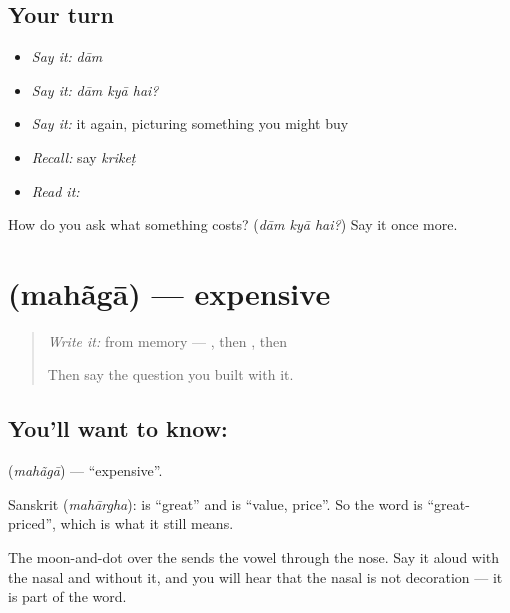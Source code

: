 \subsection*{Your turn}
\begin{itemize}
\raggedright
  \item \emph{Say it:} \emph{dām}
  \item \emph{Say it:} \emph{dām kyā hai?}
  \item \emph{Say it:} it again, picturing something you might buy
  \item \emph{Recall:} say \emph{krikeṭ}
  \item \emph{Read it:} \textbf{}
\end{itemize}

\begin{tcolorbox}[breakable,colback=teal!4,colframe=teal!35!black,title={Before you move on}]
How do you ask what something costs? (\emph{dām kyā hai?}) Say it once more.
\end{tcolorbox}
\section[\texorpdfstring{\hi{महँगा} (mahãgā)}{महँगा (mahãgā)}]{ (mahãgā) — expensive}

\label{lesson:HI-C72-expensive}



\begin{quote}
\emph{Write it:} \textbf{} from memory — , then , then 

Then say the question you built with it.
\end{quote}

\subsection*{You'll want to know: }
\textbf{} (\emph{mahãgā}) — \textquotedblleft{}expensive\textquotedblright{}.

Sanskrit  (\emph{mahārgha}): \textbf{} is \textquotedblleft{}great\textquotedblright{} and \textbf{} is \textquotedblleft{}value, price\textquotedblright{}. So the word is \textquotedblleft{}great-priced\textquotedblright{}, which is what it still means.

The moon-and-dot  over the  sends the vowel through the nose. Say it aloud with the nasal and without it, and you will hear that the nasal is not decoration — it is part of the word.


